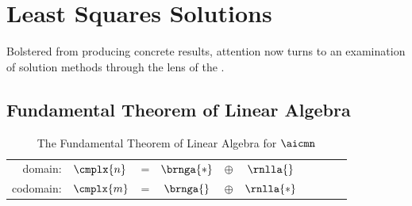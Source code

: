 \chapter{\label{ch:least squares solutions}Least Squares Solutions}

Bolstered from producing concrete results, attention now turns to an examination of solution methods through the lens of the \ft.

\section{\label{sec:ftola}Fundamental Theorem of Linear Algebra}  %
\begin{table}[htbp]  %
    \caption[The Fundamental Theorem of Linear Algebra]{The Fundamental Theorem of Linear Algebra for $\aicmn$ }
    \begin{center}
    		\begin{tabular}{rlcccccccc}
    		  domain:   & $\cmplx{n}$ & = & $\brnga{*}$ & $\oplus$ & $\rnlla{}$ \\
    		  codomain: & $\cmplx{m}$ & = & $\brnga{}$  & $\oplus$ & $\rnlla{*}$
      \end{tabular}
    \end{center}
  \label{tab:ftola}
  \end{table}%

